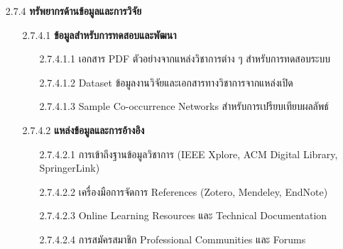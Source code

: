 \documentclass[12pt,a4paper]{article}
\begin{document}
\begin{enumerate}[leftmargin=2cm]
{\begin{enumerate}
\begin{enumerate}
                \item[2.7.3.4] \textbf{เทคโนโลยี DevOps และ Infrastructure}
                \begin{enumerate}
                    \item[2.7.3.4.1] CI/CD Tools (GitHub Actions, GitLab CI, Jenkins)
                    \item[2.7.3.4.2] Infrastructure as Code (Terraform, CloudFormation)
                    \item[2.7.3.4.3] Monitoring และ Logging (Prometheus, Grafana, ELK Stack)
                    \item[2.7.3.4.4] Container Orchestration (Kubernetes, Docker Swarm)
                \end{enumerate}
            \end{enumerate}

            \vspace{1cm}

            \item[2.7.4] \textbf{ทรัพยากรด้านข้อมูลและการวิจัย}
            \begin{enumerate}
                \item[2.7.4.1] \textbf{ข้อมูลสำหรับการทดสอบและพัฒนา}
                \begin{enumerate}
                    \item[2.7.4.1.1] เอกสาร PDF ตัวอย่างจากแหล่งวิชาการต่าง ๆ สำหรับการทดสอบระบบ
                    \item[2.7.4.1.2] Dataset ข้อมูลงานวิจัยและเอกสารทางวิชาการจากแหล่งเปิด
                    \item[2.7.4.1.3] Sample Co-occurrence Networks สำหรับการเปรียบเทียบผลลัพธ์
                \end{enumerate}
                
                \item[2.7.4.2] \textbf{แหล่งข้อมูลและการอ้างอิง}
                \begin{enumerate}
                    \item[2.7.4.2.1] การเข้าถึงฐานข้อมูลวิชาการ (IEEE Xplore, ACM Digital Library, SpringerLink)
                    \item[2.7.4.2.2] เครื่องมือการจัดการ References (Zotero, Mendeley, EndNote)
                    \item[2.7.4.2.3] Online Learning Resources และ Technical Documentation
                    \item[2.7.4.2.4] การสมัครสมาชิก Professional Communities และ Forums
                \end{enumerate}
            \end{enumerate}


\end{enumerate}}
\end{enumerate}
\end{document}
